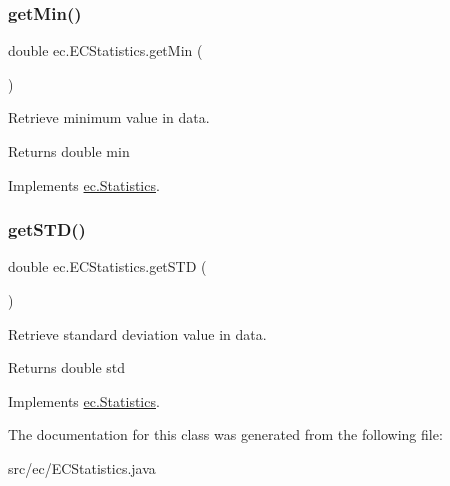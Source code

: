 \subsubsection{\texorpdfstring{get\+Min()}{getMin()}}
{\footnotesize\ttfamily double ec.\+E\+C\+Statistics.\+get\+Min (\begin{DoxyParamCaption}{ }\end{DoxyParamCaption})}



Retrieve minimum value in data. 

\begin{DoxyReturn}{Returns}
double min 
\end{DoxyReturn}


Implements \hyperlink{interfaceec_1_1_statistics_acee86eecccfe2d050c9a13a11f235d8d}{ec.\+Statistics}.

\mbox{\label{classec_1_1_e_c_statistics_a62cb7d1e5f86a179c68cc8a9c450b835}} 
\subsubsection{\texorpdfstring{get\+S\+T\+D()}{getSTD()}}
{\footnotesize\ttfamily double ec.\+E\+C\+Statistics.\+get\+S\+TD (\begin{DoxyParamCaption}{ }\end{DoxyParamCaption})}



Retrieve standard deviation value in data. 

\begin{DoxyReturn}{Returns}
double std 
\end{DoxyReturn}


Implements \hyperlink{interfaceec_1_1_statistics_a51643b39410b478bc996068eeb48ca0d}{ec.\+Statistics}.



The documentation for this class was generated from the following file\+:\begin{DoxyCompactItemize}
\item 
src/ec/E\+C\+Statistics.\+java\end{DoxyCompactItemize}
